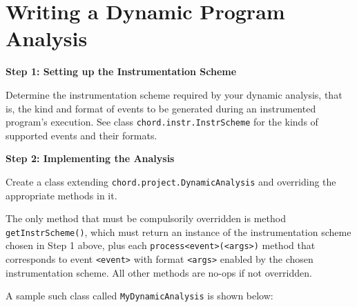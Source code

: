 \section{Writing a Dynamic Program Analysis}
\label{sec:writing-dynamic-analysis}

{\bf Step 1: Setting up the Instrumentation Scheme}

Determine the instrumentation scheme required by your dynamic analysis, that is,
the kind and format of events to be generated during an instrumented program's
execution. See class \verb+chord.instr.InstrScheme+ for the kinds of supported
events and their formats.

{\bf Step 2: Implementing the Analysis}

Create a class extending \verb+chord.project.DynamicAnalysis+ and overriding
the appropriate methods in it.

The only method that must be compulsorily overridden is method \verb+getInstrScheme()+,
which must return an instance of the instrumentation scheme chosen in Step 1 above,
plus each \verb+process<event>(<args>)+ method that corresponds to event \verb+<event>+
with format \verb+<args>+ enabled by the chosen instrumentation scheme.
All other methods are no-ops if not overridden.

A sample such class called \verb+MyDynamicAnalysis+ is shown below:

